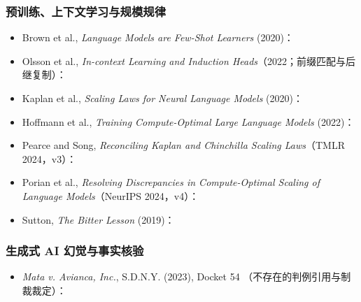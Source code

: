 \subsubsection*{预训练、上下文学习与规模规律}
\begin{itemize}
\item Brown et al., \emph{Language Models are Few-Shot Learners} (2020)：
\item Olsson et al., \emph{In-context Learning and Induction Heads}（2022；前缀匹配与后继复制）：
\item {}\label{source:scaling-laws}Kaplan et al., \emph{Scaling Laws for Neural Language Models} (2020)：
\item {}\label{source:chinchilla}Hoffmann et al., \emph{Training Compute-Optimal Large Language Models} (2022)：
\item {}\label{source:scaling-reconciliation}Pearce and Song, \emph{Reconciling Kaplan and Chinchilla Scaling Laws}（TMLR 2024，v3）：
\item {}\label{source:scaling-discrepancies}Porian et al., \emph{Resolving Discrepancies in Compute-Optimal Scaling of Language Models}（NeurIPS 2024，v4）：
\item Sutton, \emph{The Bitter Lesson} (2019)：
\end{itemize}

\subsubsection*{生成式 AI 幻觉与事实核验}
\begin{itemize}
\item \emph{Mata v. Avianca, Inc.}, S.D.N.Y. (2023), Docket 54
（不存在的判例引用与制裁裁定）：
\end{itemize}

